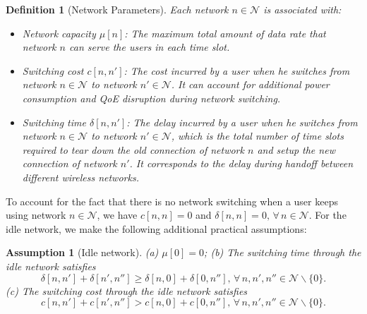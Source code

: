 \documentclass[journal]{IEEEtran}
\newcommand{\sls}[1]{\backslash \{#1\}}
\newtheorem{assumption}{Assumption}
\newtheorem{definition}{Definition}
\begin{document}
\begin{definition}[Network Parameters]
  Each network $n\in\mathcal{N}$ is associated with:	
\begin{itemize}
\item \emph{Network capacity} $\mu[n]$: The maximum total amount of data rate that network $n$ can serve the users in each time slot. 

\item \emph{Switching cost} $c[n,n']$: The cost incurred by a user when he switches from network $n \in \mathcal{N}$ to network $n' \in \mathcal{N}$. It can account for additional power consumption and QoE disruption \cite{southwell_sm12} during network switching. 

\item \emph{Switching time} $\delta[n,n']$: The delay incurred by a user when he switches from network $n \in \mathcal{N}$ to network $n' \in \mathcal{N}$, which is the total number of time slots required to tear down the old connection of network $n$ and setup the new connection of network $n'$. It corresponds to the delay during handoff between different wireless networks. 

\end{itemize}
\end{definition}

  To account for the fact that there is no network switching when a user keeps using network $n \in \mathcal{N}$, we have $c[n,n] = 0$ and $\delta[n,n] = 0, \, \forall \, n \in \mathcal{N}$.
  For the idle network, we make the following additional practical assumptions:

\begin{assumption}[Idle network] \label{ass:idle}
  (a) $\mu[0] = 0$;
	(b) The switching time through the idle network satisfies
%
\begin{equation} \label{equ:triangleineq_delta}
	\delta[n,n'] + \delta[n',n''] \geq \delta[n,0] + \delta[0,n''], \, \forall \, n,n',n'' \in \mathcal{N} \sls{0}.
\end{equation}
% 	
	(c) The switching cost through the idle network satisfies
%
\begin{equation} \label{equ:triangleineq}
	c[n,n'] + c[n',n''] > c[n,0] + c[0,n''], \, \forall \, n,n',n'' \in \mathcal{N} \sls{0}.
\end{equation}
% 	
\end{assumption}
\end{document}
